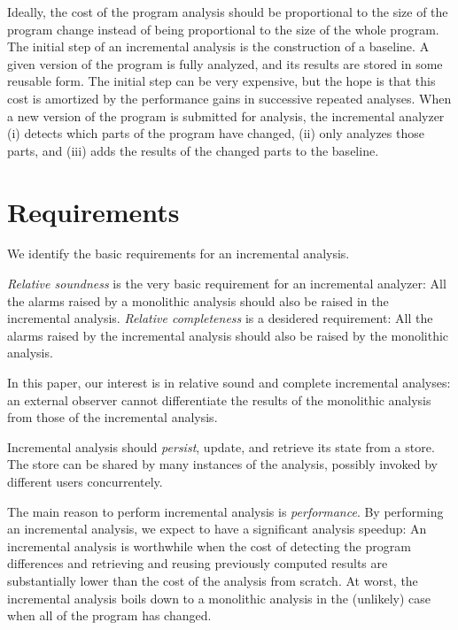 \documentclass{llncs}
\begin{document}
Ideally, the cost of the program analysis should be proportional to
the size of the program change instead of being proportional to the
size of the whole program.  The initial step of an incremental
analysis is the construction of a baseline.  A given version of the
program is fully analyzed, and its results are stored in some reusable
form.  The initial step can be very expensive, but the hope is that
this cost is amortized by the performance gains in successive repeated
analyses.  When a new version of the program is submitted for
analysis, the incremental analyzer (i) detects which parts of the
program have changed, (ii) only analyzes those parts, and (iii)
adds the results of the changed parts to the baseline.

\section{Requirements}
We identify the basic requirements for an incremental analysis.

\emph{Relative soundness} is the very basic requirement for an incremental analyzer:
All the  alarms raised by a monolithic analysis should also be raised in the incremental analysis.
\emph{Relative completeness} is a desidered requirement:
All the alarms raised by the incremental analysis should also be raised by the monolithic analysis.

In this paper, our interest  is in relative sound and complete incremental analyses: an external observer cannot differentiate the results of the monolithic analysis from those of the  incremental analysis.

Incremental analysis should  \emph{persist}, update, and retrieve its state from a store.
The store can be shared by many instances of the analysis, possibly invoked by different users concurrentely.


The main reason to perform incremental analysis is \emph{performance}.
By performing an incremental analysis, we expect to have a significant analysis speedup: 
An incremental analysis is worthwhile when the cost of detecting the program differences and retrieving and reusing previously computed results are substantially lower than the cost of the analysis from scratch.
At worst, the incremental analysis  boils down to a monolithic analysis in the (unlikely) case when all of the program has changed.
\end{document}
